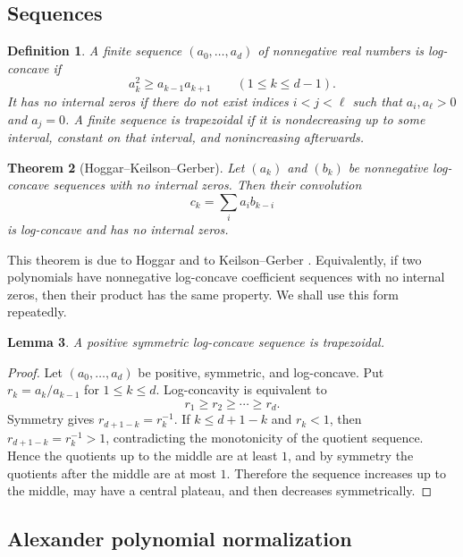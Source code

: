 \documentclass[11pt]{amsart}
\newtheorem{theorem}{Theorem}[section]
\newtheorem{lemma}[theorem]{Lemma}
\newtheorem{definition}[theorem]{Definition}
\begin{document}
\subsection{Sequences}

\begin{definition}
A finite sequence \((a_0,\ldots,a_d)\) of nonnegative real numbers is \emph{log-concave} if
\[
        a_k^2\ge a_{k-1}a_{k+1}
        \qquad (1\le k\le d-1).
\]
It has \emph{no internal zeros} if there do not exist indices \(i<j<\ell\) such that \(a_i,a_\ell>0\) and \(a_j=0\).  A finite sequence is \emph{trapezoidal} if it is nondecreasing up to some interval, constant on that interval, and nonincreasing afterwards.
\end{definition}

\begin{theorem}[Hoggar--Keilson--Gerber]\label{thm:convolution}
Let \((a_k)\) and \((b_k)\) be nonnegative log-concave sequences with no internal zeros.  Then their convolution
\[
        c_k=\sum_i a_i b_{k-i}
\]
is log-concave and has no internal zeros.
\end{theorem}

This theorem is due to Hoggar and to Keilson--Gerber \cite{hoggar,keilson-gerber}.  Equivalently, if two polynomials have nonnegative log-concave coefficient sequences with no internal zeros, then their product has the same property.  We shall use this form repeatedly.

\begin{lemma}\label{lem:symm-lc-trap}
A positive symmetric log-concave sequence is trapezoidal.
\end{lemma}

\begin{proof}
Let \((a_0,\ldots,a_d)\) be positive, symmetric, and log-concave.  Put \(r_k=a_k/a_{k-1}\) for \(1\le k\le d\).  Log-concavity is equivalent to
\[
        r_1\ge r_2\ge\cdots\ge r_d.
\]
Symmetry gives \(r_{d+1-k}=r_k^{-1}\).  If \(k\le d+1-k\) and \(r_k<1\), then \(r_{d+1-k}=r_k^{-1}>1\), contradicting the monotonicity of the quotient sequence.  Hence the quotients up to the middle are at least \(1\), and by symmetry the quotients after the middle are at most \(1\).  Therefore the sequence increases up to the middle, may have a central plateau, and then decreases symmetrically.
\end{proof}

\subsection{Alexander polynomial normalization}
\end{document}

